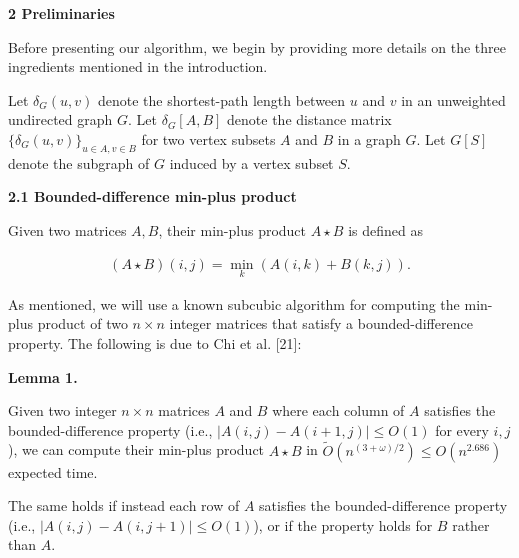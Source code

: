 \documentclass[10pt,a4paper]{article}
\begin{document}
\par
\par
\par\medskip\noindent\textbf{2 Preliminaries}\par
Before presenting our algorithm, we begin by providing more details on the three ingredients mentioned in the introduction.
\par
\par
Let $\delta_{G}(u,v)$ denote the shortest-path length between $u$ and $v$ in an unweighted undirected graph $G$. Let $\delta_{G}[A,B]$ denote the distance matrix $\{\delta_{G}(u,v)\}_{u\in A,v\in B}$ for two vertex subsets $A$ and $B$ in a graph $G$. Let $G[S]$ denote the subgraph of $G$ induced by a vertex subset $S$.
\par
\par
\par\medskip\noindent\textbf{2.1 Bounded-difference min-plus product}\par
Given two matrices $A,B$, their min-plus product $A\star B$ is defined as
\par
\[\begin{aligned}
(A\star B)(i,j)=\min_{k}(A(i,k)+B(k,j)).
\end{aligned}\]
\par
As mentioned, we will use a known subcubic algorithm for computing the min-plus product of two $n\times n$ integer matrices that satisfy a bounded-difference property. The following is due to Chi et al. [21]:
\par
\par
\par\medskip\noindent\textbf{Lemma 1.}\par
Given two integer $n\times n$ matrices $A$ and $B$ where each column of $A$ satisfies the bounded-difference property (i.e., $|A(i,j)-A(i+1,j)|\leq O(1)$ for every $i,j$), we can compute their min-plus product $A\star B$ in $\widetilde{O}(n^{(3+\omega)/2})\leq O(n^{2.686})$ expected time.
\par
\par
The same holds if instead each row of $A$ satisfies the bounded-difference property (i.e., $|A(i,j)-A(i,j+1)|\leq O(1)$), or if the property holds for $B$ rather than $A$.
\par
\par
\end{document}
